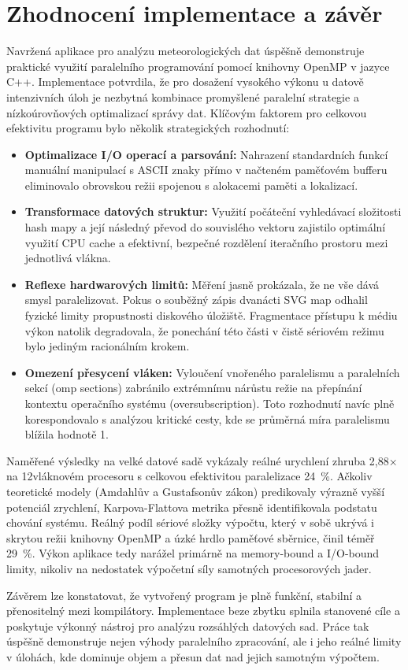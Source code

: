 \documentclass[10pt, a4paper]{report}
\begin{document}
	
	\chapter{Zhodnocení implementace a závěr}
	
	Navržená aplikace pro analýzu meteorologických dat úspěšně demonstruje praktické využití paralelního programování pomocí knihovny OpenMP v jazyce C++. Implementace potvrdila, že pro dosažení vysokého výkonu u datově intenzivních úloh je nezbytná kombinace promyšlené paralelní strategie a nízkoúrovňových optimalizací správy dat. Klíčovým faktorem pro celkovou efektivitu programu bylo několik strategických rozhodnutí:
	\begin{itemize}
		\item \textbf{Optimalizace I/O operací a parsování:} Nahrazení standardních funkcí manuální manipulací s ASCII znaky přímo v načteném paměťovém bufferu eliminovalo obrovskou režii spojenou s alokacemi paměti a lokalizací.
		\item \textbf{Transformace datových struktur:} Využití počáteční vyhledávací složitosti hash mapy a její následný převod do souvislého vektoru zajistilo optimální využití CPU cache a efektivní, bezpečné rozdělení iteračního prostoru mezi jednotlivá vlákna.
		\item \textbf{Reflexe hardwarových limitů:} Měření jasně prokázala, že ne vše dává smysl paralelizovat. Pokus o souběžný zápis dvanácti SVG map odhalil fyzické limity propustnosti diskového úložiště. Fragmentace přístupu k médiu výkon natolik degradovala, že ponechání této části v čistě sériovém režimu bylo jediným racionálním krokem.
		\item \textbf{Omezení přesycení vláken:} Vyloučení vnořeného paralelismu a paralelních sekcí (omp sections) zabránilo extrémnímu nárůstu režie na přepínání kontextu operačního systému (oversubscription). Toto rozhodnutí navíc plně korespondovalo s analýzou kritické cesty, kde se průměrná míra paralelismu blížila hodnotě 1.
	\end{itemize}
	
	Naměřené výsledky na velké datové sadě vykázaly reálné urychlení zhruba 2,88× na 12vláknovém procesoru s celkovou efektivitou paralelizace 24~\%. Ačkoliv teoretické modely (Amdahlův a Gustafsonův zákon) predikovaly výrazně vyšší potenciál zrychlení, Karpova-Flattova metrika přesně identifikovala podstatu chování systému. Reálný podíl sériové složky výpočtu, který v sobě ukrývá i skrytou režii knihovny OpenMP a úzké hrdlo paměťové sběrnice, činil téměř 29~\%. Výkon aplikace tedy narážel primárně na memory-bound a I/O-bound limity, nikoliv na nedostatek výpočetní síly samotných procesorových jader.
	
	Závěrem lze konstatovat, že vytvořený program je plně funkční, stabilní a přenositelný mezi kompilátory. Implementace beze zbytku splnila stanovené cíle a poskytuje výkonný nástroj pro analýzu rozsáhlých datových sad. Práce tak úspěšně demonstruje nejen výhody paralelního zpracování, ale i jeho reálné limity v úlohách, kde dominuje objem a přesun dat nad jejich samotným výpočtem.
	
\end{document}
